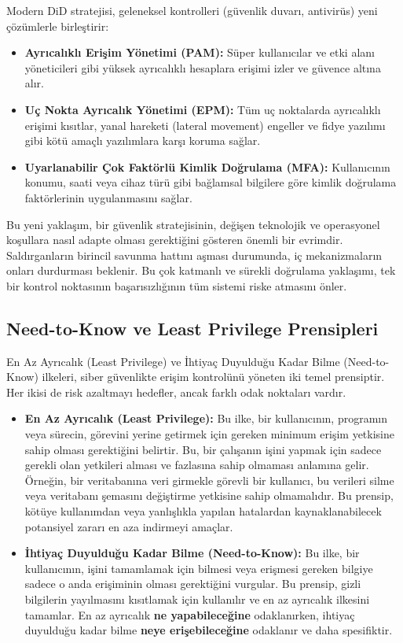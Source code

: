 Modern DiD stratejisi, geleneksel kontrolleri (güvenlik duvarı, antivirüs) yeni çözümlerle birleştirir:

\begin{itemize}
    \item \textbf{Ayrıcalıklı Erişim Yönetimi (PAM):} Süper kullanıcılar ve etki alanı yöneticileri gibi yüksek ayrıcalıklı hesaplara erişimi izler ve güvence altına alır.
    \item \textbf{Uç Nokta Ayrıcalık Yönetimi (EPM):} Tüm uç noktalarda ayrıcalıklı erişimi kısıtlar, yanal hareketi (lateral movement) engeller ve fidye yazılımı gibi kötü amaçlı yazılımlara karşı koruma sağlar.
    \item \textbf{Uyarlanabilir Çok Faktörlü Kimlik Doğrulama (MFA):} Kullanıcının konumu, saati veya cihaz türü gibi bağlamsal bilgilere göre kimlik doğrulama faktörlerinin uygulanmasını sağlar.
\end{itemize}

Bu yeni yaklaşım, bir güvenlik stratejisinin, değişen teknolojik ve operasyonel koşullara nasıl adapte olması gerektiğini gösteren önemli bir evrimdir. Saldırganların birincil savunma hattını aşması durumunda, iç mekanizmaların onları durdurması beklenir. Bu çok katmanlı ve sürekli doğrulama yaklaşımı, tek bir kontrol noktasının başarısızlığının tüm sistemi riske atmasını önler.

\subsection{Need-to-Know ve Least Privilege Prensipleri}

En Az Ayrıcalık (Least Privilege) ve İhtiyaç Duyulduğu Kadar Bilme (Need-to-Know) ilkeleri, siber güvenlikte erişim kontrolünü yöneten iki temel prensiptir. Her ikisi de risk azaltmayı hedefler, ancak farklı odak noktaları vardır.

\begin{itemize}
    \item \textbf{En Az Ayrıcalık (Least Privilege):} Bu ilke, bir kullanıcının, programın veya sürecin, görevini yerine getirmek için gereken minimum erişim yetkisine sahip olması gerektiğini belirtir. Bu, bir çalışanın işini yapmak için sadece gerekli olan yetkileri alması ve fazlasına sahip olmaması anlamına gelir. Örneğin, bir veritabanına veri girmekle görevli bir kullanıcı, bu verileri silme veya veritabanı şemasını değiştirme yetkisine sahip olmamalıdır. Bu prensip, kötüye kullanımdan veya yanlışlıkla yapılan hatalardan kaynaklanabilecek potansiyel zararı en aza indirmeyi amaçlar.
    \item \textbf{İhtiyaç Duyulduğu Kadar Bilme (Need-to-Know):} Bu ilke, bir kullanıcının, işini tamamlamak için bilmesi veya erişmesi gereken bilgiye sadece o anda erişiminin olması gerektiğini vurgular. Bu prensip, gizli bilgilerin yayılmasını kısıtlamak için kullanılır ve en az ayrıcalık ilkesini tamamlar. En az ayrıcalık \textbf{ne yapabileceğine} odaklanırken, ihtiyaç duyulduğu kadar bilme \textbf{neye erişebileceğine} odaklanır ve daha spesifiktir.
\end{itemize}

